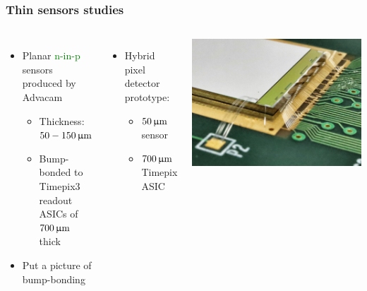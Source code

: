 \begin{frame}
  \frametitle{Thin sensors studies}

  \begin{columns}
    \begin{itemize}
    \item Planar \textcolor{Green}{n-in-p} sensors produced by Advacam
      \begin{itemize}
      \item Thickness: \textcolor{Green}{$50 - 150\,\upmu\mathrm{m}$}
      \item Bump-bonded to Timepix3 readout ASICs of
        \textcolor{Green}{$700\,\upmu\mathrm{m}$} thick
      \end{itemize}
    \item Put a picture of bump-bonding
    \end{itemize}

    \begin{itemize}
    \item Hybrid pixel detector prototype:
      \begin{itemize}
      \item $50\,\upmu\mathrm{m}$ sensor
      \item $700\,\upmu\mathrm{m}$ Timepix ASIC
      \end{itemize}
    \end{itemize}
    \centering
    \includegraphics[width=\textwidth]{figures/Advacam-50um-assembly.jpeg}
  \end{columns}


\end{frame}

